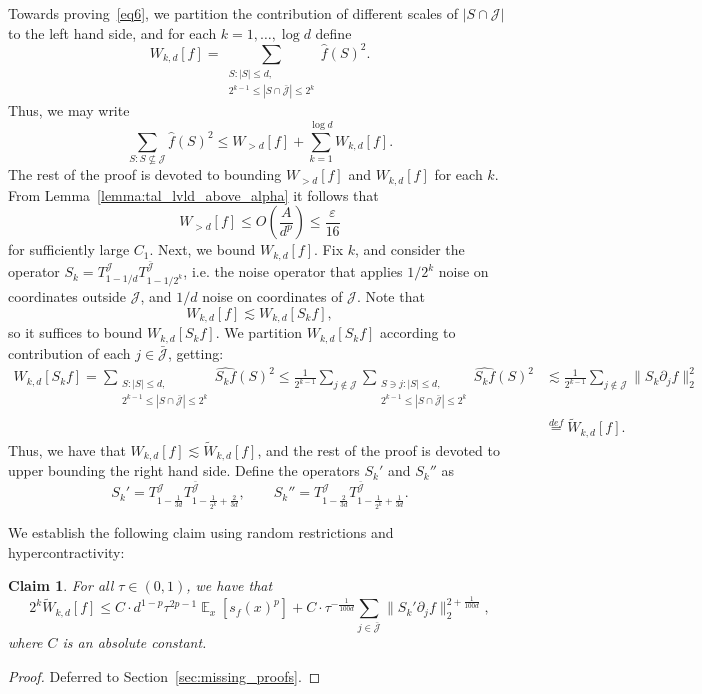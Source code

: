 \documentclass[10pt]{article}
\newcommand{\card}[1]{\left\lvert #1\right\rvert}
\newcommand{\Expect}[2]{{\mathop{\mathbb E}_{#1}\left[#2\right]}}
\newcommand{\norm}[1]{\lVert #1\rVert}
\newcommand{\defeq}{\stackrel{def}{=}}
\newcommand{\eps}{\varepsilon}
\renewcommand{\ll}{\lesssim}
\newtheorem{claim}[thm]{Claim}
\begin{document}
Towards proving~\eqref{eq6}, we partition the contribution of different scales of
$\card{S\cap \mathcal{J}}$ to the left hand side, and for each $k=1,\ldots,\log d$ define
\[
W_{k,d}[f] = \sum\limits_{\substack{S: \card{S}\leq d,\\ 2^{k-1}\leq \card{S\cap \bar{\mathcal{J}}}\leq 2^k}}\widehat{f}(S)^2.
\]
Thus, we may write
\begin{equation}\label{eq:super_frid1}
  \sum\limits_{S: S\not\subseteq \mathcal{J}}\widehat{f}(S)^2
  \leq
  W_{>d}[f]
  +
  \sum\limits_{k=1}^{\log d} W_{k,d}[f].
\end{equation}
The rest of the proof is devoted to bounding $W_{>d}[f]$ and $W_{k,d}[f]$ for each $k$.
From Lemma~\ref{lemma:tal_lvld_above_alpha} it follows that
\begin{equation}\label{eq:super_frid}
  W_{>d}[f]\leq O\left(\frac{A}{d^p}\right) \leq \frac{\eps}{16}
\end{equation}
for sufficiently large $C_1$. Next, we bound $W_{k,d}[f]$. Fix $k$, and consider the operator $S_k = T_{1-1/d}^{\mathcal{J}}T_{1-1/2^{k}}^{\bar{\mathcal{J}}}$,
i.e. the noise operator that applies $1/2^k$ noise on coordinates outside $\mathcal{J}$, and $1/d$ noise on coordinates of $\mathcal{J}$. Note that
\[
W_{k,d}[f] \ll W_{k,d}[S_k f],
\]
so it suffices to bound $W_{k,d}[S_k f]$. We partition $W_{k,d}[S_k f]$ according to contribution of each $j\in\bar{\mathcal{J}}$, getting:
\begin{align*}
W_{k,d}[S_k f]
=\sum\limits_{\substack{S: \card{S}\leq d,\\ 2^{k-1}\leq \card{S\cap \bar{\mathcal{J}}}\leq 2^k}} \widehat{S_k f}(S)^2
\leq \frac{1}{2^{k-1}} \sum\limits_{j\not\in\mathcal{J}}\sum\limits_{\substack{S\ni j: \card{S}\leq d,\\ 2^{k-1}\leq \card{S\cap \bar{\mathcal{J}}}\leq 2^k}} \widehat{S_k f}(S)^2
&\ll \frac{1}{2^{k-1}} \sum\limits_{j\not\in\mathcal{J}}\norm{S_k \partial_j f}_2^2\\
&\defeq \tilde{W}_{k,d}[f].
\end{align*}
Thus, we have that $W_{k,d}[f]\ll \tilde{W}_{k,d}[f]$, and the rest of the proof is devoted to upper bounding the right hand side.
Define the operators $S_{k}'$ and $S_k''$ as
\[
S_k' = T_{1-\frac{1}{3d}}^{\mathcal{J}}T_{1-\frac{1}{2^{k}}+\frac{2}{3d}}^{\bar{\mathcal{J}}},
\qquad
S_k'' = T_{1-\frac{2}{3d}}^{\mathcal{J}}T_{1-\frac{1}{2^{k}}+\frac{1}{3d}}^{\bar{\mathcal{J}}}.
\]

We establish the following claim using random restrictions and hypercontractivity:
\begin{claim}\label{claim:super_fried_main}
  For all $\tau\in (0,1)$, we have that
  \[
  2^k \tilde{W}_{k,d}[f]\leq
  C\cdot d^{1-p}\tau^{2p-1} \Expect{x}{s_f(x)^p} + C\cdot\tau^{-\frac{1}{100 d}}\sum\limits_{j\in\bar{\mathcal{J}}} \norm{S_k' \partial_j f}_2^{2+\frac{1}{100d}},
  \]
  where $C$ is an absolute constant.
\end{claim}
\begin{proof}
  Deferred to Section~\ref{sec:missing_proofs}.
\end{proof}
\end{document}
